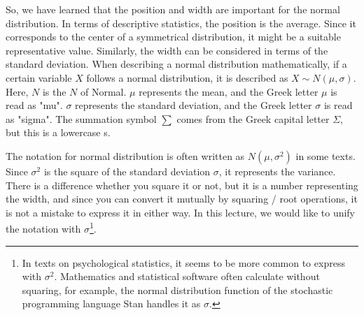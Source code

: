 \documentclass{ltjbook}
\begin{document}
So, we have learned that the position and width are important for the normal distribution.
In terms of descriptive statistics, the position is the average. Since it corresponds to the center of a symmetrical distribution, it might be a suitable representative value. Similarly, the width can be considered in terms of the standard deviation.
When describing a normal distribution mathematically, if a certain variable $X$ follows a normal distribution, it is described as $X\sim N(\mu,\sigma)$. Here, $N$ is the $N$ of Normal. $\mu$ represents the mean, and the Greek letter $\mu$ is read as "mu". $\sigma$ represents the standard deviation, and the Greek letter $\sigma$ is read as "sigma". The summation symbol $\sum$ comes from the Greek capital letter $\Sigma$, but this is a lowercase s.

The notation for normal distribution is often written as $N(\mu, \sigma^2)$ in some texts. Since $\sigma^2$ is the square of the standard deviation $\sigma$, it represents the variance. There is a difference whether you square it or not, but it is a number representing the width, and since you can convert it mutually by squaring / root operations, it is not a mistake to express it in either way. In this lecture, we would like to unify the notation with $\sigma$\footnote{In texts on psychological statistics, it seems to be more common to express with $\sigma^2$. Mathematics and statistical software often calculate without squaring, for example, the normal distribution function of the stochastic programming language Stan handles it as $\sigma$. }.
\end{document}
